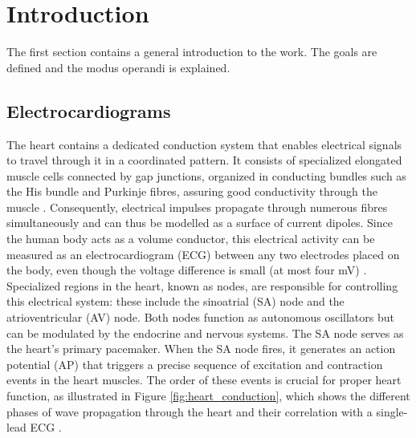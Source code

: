 \chapter{Introduction}
\label{cha:intro}
The first section contains a general introduction to the work. The goals are defined and the modus operandi is explained.

\section{Electrocardiograms}
\label{sec:ECG}

The heart contains a dedicated conduction system that enables electrical signals to travel through it in a coordinated pattern. It consists of specialized elongated muscle cells connected by gap junctions, organized in conducting bundles such as the His bundle and Purkinje fibres, assuring good conductivity through the muscle \cite{villanelo_accessing_2017}. Consequently, electrical impulses propagate through numerous fibres simultaneously and can thus be modelled as a surface of current dipoles. Since the human body acts as a volume conductor, this electrical activity can be measured as an electrocardiogram (ECG) between any two electrodes placed on the body, even though the voltage difference is small (at most four mV) \cite{openstax_cardiovascular_2022}.
\\
Specialized regions in the heart, known as nodes, are responsible for controlling this electrical system: these include the sinoatrial (SA) node and the atrioventricular (AV) node. Both nodes function as autonomous oscillators but can be modulated by the endocrine and nervous systems. The SA node serves as the heart's primary pacemaker. When the SA node fires, it generates an action potential (AP) that triggers a precise sequence of excitation and contraction events in the heart muscles. The order of these events is crucial for proper heart function, as illustrated in Figure \ref{fig:heart_conduction}, which shows the different phases of wave propagation through the heart and their correlation with a single-lead ECG \cite{keener_cardiac_1998, openstax_cardiovascular_2022}.

